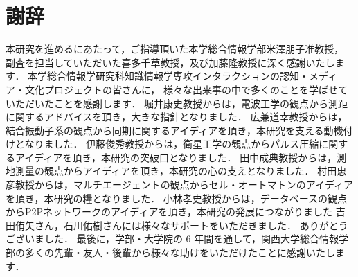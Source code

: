 \chapter*{謝辞}

本研究を進めるにあたって，ご指導頂いた本学総合情報学部米澤朋子准教授，
副査を担当していただいた喜多千草教授，及び加藤隆教授に深く感謝いたします．
本学総合情報学研究科知識情報学専攻インタラクションの認知・メディア・文化プロジェクトの皆さんに，
様々な出来事の中で多くのことを学ばせていただいたことを感謝します．
堀井康史教授からは，電波工学の観点から測距に関するアドバイスを頂き，大きな指針となりました．
広兼道幸教授からは，結合振動子系の観点から同期に関するアイディアを頂き，本研究を支える動機付けとなりました．
伊藤俊秀教授からは，衛星工学の観点からパルス圧縮に関するアイディアを頂き，本研究の突破口となりました．
田中成典教授からは，測地測量の観点からアイディアを頂き，本研究の心の支えとなりました．
村田忠彦教授からは，マルチエージェントの観点からセル・オートマトンのアイディアを頂き，本研究の糧となりました．
小林孝史教授からは，データベースの観点からP2Pネットワークのアイディアを頂き，本研究の発展につながりました
吉田侑矢さん，石川佑樹さんには様々なサポートをいただきました．
ありがとうございました．
最後に，学部・大学院の 6 年間を通して，関西大学総合情報学部の多くの先輩・友人・後輩から様々な助けをいただけたことに感謝いたします．
